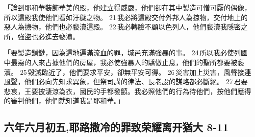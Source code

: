 「論到耶和華裝飾華美的殿，他建立得威嚴，他們卻在其中製造可憎可厭的偶像，所以這殿我使他們看如汙穢之物。 21 我必將這殿交付外邦人為掠物，交付地上的惡人為擄物，他們也必褻瀆這殿。 22 我必轉臉不顧以色列人，他們褻瀆我隱密之所，強盜也必進去褻瀆。

「要製造鎖鏈，因為這地遍滿流血的罪，城邑充滿強暴的事。 24 所以我必使列國中最惡的人來占據他們的房屋，我必使強暴人的驕傲止息，他們的聖所都要被褻瀆。 25 毀滅臨近了，他們要求平安，卻無平安可得。 26 災害加上災害，風聲接連風聲，他們必向先知求異象，但祭司講的律法、長老設的謀略都必斷絕。 27 君要悲哀，王要披淒涼為衣，國民的手都發顫。我必照他們的行為待他們，按他們應得的審判他們，他們就知道我是耶和華。」

\subsection{六年六月初五,耶路撒冷的罪致荣耀离开猶大 8-11}
